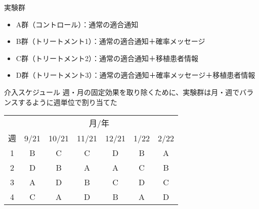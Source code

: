 \documentclass[
      aspectratio=169,
        12pt,
    ]{beamer}
\providecommand{\tightlist}{%
  \setlength{\itemsep}{0pt}\setlength{\parskip}{0pt}}
\begin{document}
\begin{frame}{実験群}
\protect\hypertarget{ux5b9fux9a13ux7fa4}{}
\begin{itemize}
\tightlist
\item
  A群（コントロール）：通常の適合通知
\item
  B群（トリートメント1）：通常の適合通知＋確率メッセージ
\item
  C群（トリートメント2）：通常の適合通知＋移植患者情報
\item
  D群（トリートメント3）：通常の適合通知＋確率メッセージ＋移植患者情報
\end{itemize}
\end{frame}

\begin{frame}{介入スケジュール}
\protect\hypertarget{ux4ecbux5165ux30b9ux30b1ux30b8ux30e5ux30fcux30eb}{}
週・月の固定効果を取り除くために、実験群は月・週でバランスするように週単位で割り当てた

\begin{table}
\centering
\begin{tabular}[t]{ccccccc}
\toprule
\multicolumn{1}{c}{ } & \multicolumn{6}{c}{月/年} \\
\cmidrule(l{3pt}r{3pt}){2-7}
週 & 9/21 & 10/21 & 11/21 & 12/21 & 1/22 & 2/22\\
\midrule
1 & B & C & C & D & B & A\\
2 & D & B & A & A & C & B\\
3 & A & D & B & C & D & C\\
4 & C & A & D & B & A & D\\
\bottomrule
\end{tabular}
\end{table}
\end{frame}
\end{document}
